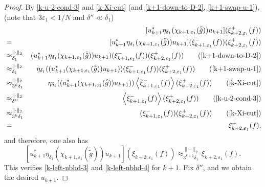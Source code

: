\documentclass[12pt, oneside, psamsfonts]{amsart}
\theoremstyle{definition}
\theoremstyle{remark}
\numberwithin{equation}{section}
\newcommand{\norm}[1]{\| #1\|}
\newcommand{\eps}{\varepsilon}
\begin{document}
\begin{proof}
By \eqref{k-u-2-cond-3} and \eqref{k-Xi-cut} (and \eqref{k+1-down-to-D-2}, \eqref{k+1-swap-u-1}), (note that $3\eps_1 < 1/N$ and $\delta''\ll \delta_1$)
\begin{eqnarray}\label{k+1-left-nbhd-3}
  & & [u^*_{k+1}\eta_{\delta_1}(\chi_{k+1, \eps_1}(\tilde{\tilde{g}}))u_{k+1}] (\xi^+_{k+2, \eps_1}(f)) \\
  & = & [u^*_{k+1}\eta_{\delta_1}(\chi_{k+1, \eps_1}(\tilde{\tilde{g}}))u_{k+1}]  (\xi^-_{k+1, \eps_1}(f))   (\xi^+_{k+2, \eps_1}(f))  \nonumber \\
  & \approx_{\delta_1}^{\norm{\cdot}_2}& (u^*_{k+1}\eta_{\delta_1}(\chi_{k+1, \eps_1}(\tilde{\tilde{g}}))u_{k+1})  (\xi^-_{k+1, \eps_1}(f))   (\xi^+_{k+2, \eps_1}(f))  \quad\quad ( \eqref{k+1-down-to-D-2}) \nonumber \\ 
  & \approx_{\delta_1}^{\norm{\cdot}_2}& \eta_{\delta_1}((u^*_{k+1}(\chi_{k+1, \eps_1}(\tilde{\tilde{g}}))u_{k+1}))  (\xi^-_{k+1, \eps_1}(f))   (\xi^+_{k+2, \eps_1}(f)) \quad \quad (\eqref{k+1-swap-u-1}) \nonumber \\ 
  & \approx_{3^k \delta_1}^{\norm{\cdot}_2}& \eta_{\delta_1}((u^*_{k+1}(\chi_{k+1, \eps_1}(\tilde{\tilde{g}}))u_{k+1}))  \left< \xi^-_{k+1, \eps_1}(f) \right>   (\xi^+_{k+2, \eps_1}(f)) \quad \quad (\eqref{k-Xi-cut}) \nonumber \\
  & \approx_{\delta''}^{\norm{\cdot}_2} & \left< \xi^-_{k+1, \eps_1}(f) \right>   (\xi^+_{k+2, \eps_1}(f)) \quad \quad (\eqref{k-u-2-cond-3}) \nonumber  \\
  & \approx_{3^k \delta_1}^{\norm{\cdot}_2} & ( \xi^-_{k+1, \eps_1}(f) )   (\xi^+_{k+2, \eps_1}(f)) \quad \quad (\eqref{k-Xi-cut}) \nonumber  \\
  & = &   \xi^+_{k+2, \eps_1}(f), \nonumber
  \end{eqnarray}
and therefore, one also has 
\begin{equation}\label{k+1-left-nbhd-4}
  [u^*_{k+1}\eta_{\delta_1}(\chi_{k+1, \eps_1}(\tilde{\tilde{g}}))u_{k+1}] (\xi^-_{k+2, \eps_1}(f)) \approx^{\norm{\cdot}_2}_{3^{k+1}\delta_1} \xi^-_{k+2, \eps_1}(f). 
\end{equation}  
This verifies \eqref{k-left-nbhd-3} and \eqref{k-left-nbhd-4} for $k+1$. Fix $\delta''$, and we obtain the desired $u_{k+1}$.


\end{proof}
\end{document}
